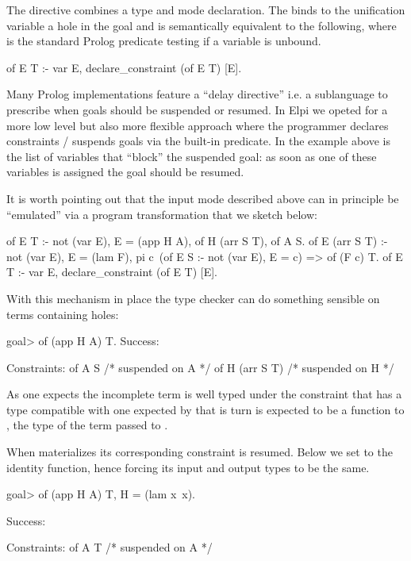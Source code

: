 \documentclass[a4paper, 11pt]{book}
\begin{document}
The  directive combines a type and mode declaration.
The  binds to the unification variable 
a hole in the goal and is semantically equivalent to the following,
where  is the standard Prolog predicate testing if
a variable is unbound.
  
\begin{elpicode}
of E T :- var E, declare_constraint (of E T) [E].
\end{elpicode}

Many Prolog implementations feature a ``delay directive'' i.e. a sublanguage to
prescribe when goals should be suspended or resumed. In Elpi we opeted for
a more low level but also more flexible approach where the programmer declares
constraints / suspends goals via  the  built-in
predicate. In the example above \elpi{[E]} is the list of variables
that ``block'' the suspended goal: as soon as one of these variables
is assigned the goal should be resumed.

It is worth pointing out that the input mode described above can in principle
be ``emulated'' via a program transformation that we sketch below:

\begin{elpicode}
of E T :- not (var E), E = (app H A), of H (arr S T), of A S.
of E (arr S T) :- not (var E), E = (lam F),
  pi c\ (of E S :- not (var E), E = c) => of (F c) T.
of E T :- var E, declare_constraint (of E T) [E].
\end{elpicode}

With this mechanism in place the type checker can do something sensible
on terms containing holes:

\begin{elpicode}
goal> of (app H A) T.
Success:

Constraints:
  of A S  /* suspended on A */
  of H (arr S T)  /* suspended on H */
\end{elpicode}

As one expects the incomplete term is well typed under the
constraint that  has a type
compatible with one expected by  that
is turn is expected to be a function to ,
the type of the term passed to .

When  materializes its corresponding
constraint is resumed. Below we set  to
the identity function, hence forcing its input and
output types to be the same.

\begin{elpicode}
goal> of (app H A) T, H = (lam x\ x).

Success:

Constraints:
  of A T  /* suspended on A */
\end{elpicode}
\end{document}
